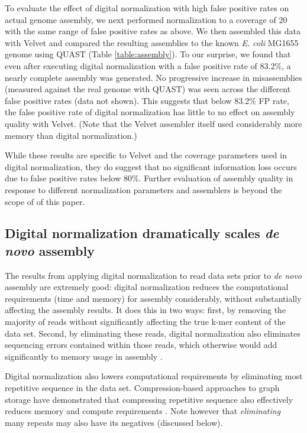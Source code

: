 To evaluate the effect of digital normalization with high false positive rates
on actual genome assembly, we next performed normalization to a coverage of 20
with the same range of false positive rates as above.  We then assembled this
data with Velvet \cite{Zerbino2008} and compared the resulting assemblies to
the known {\em E. coli} MG1655 genome using QUAST (Table \ref{table:assembly}).
To our surprise, we found that even after executing digital normalization with
a false positive rate of 83.2\%, a nearly complete assembly was generated.  No
progressive increase in misassemblies (measured against the real genome with
QUAST) was seen across the different false positive rates (data not shown).
This suggests that below 83.2\% FP rate, the false positive rate of digital
normalization has little to no effect on assembly quality with Velvet.  (Note
that the Velvet assembler itself used considerably more memory than digital
normalization.)

%
While these results are specific to Velvet and the coverage parameters used in
digital normalization, they do suggest that no significant information loss
occurs due to false positive rates below 80\%. Further evaluation of assembly
quality in response to different normalization parameters and assemblers is
beyond the scope of of this paper.


\subsection{Digital normalization dramatically scales {\em de novo} assembly}

The results from applying digital normalization to read data sets prior to {\em
de novo} assembly are extremely good: digital normalization reduces the
computational requirements (time and memory) for assembly considerably, without
substantially affecting the assembly results.  It does this in two ways: first,
by removing the majority of reads without significantly affecting the true
k-mer content of the data set. Second, by eliminating these reads, digital
normalization also eliminates sequencing errors contained within those reads,
which otherwise would add significantly to memory usage in assembly
\cite{pubmed21245053}.

Digital normalization also lowers computational requirements by eliminating
most repetitive sequence in the data set. Compression-based approaches to graph
storage have demonstrated that compressing repetitive sequence also effectively
reduces memory and compute requirements \cite{pubmed22139935,pubmed22156294}.
Note however that {\em eliminating} many repeats may also have its negatives
(discussed below).

